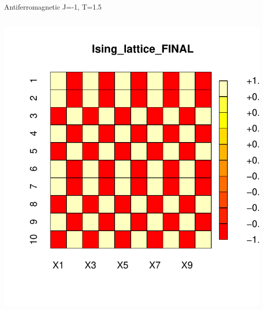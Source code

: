 \documentclass{beamer}
\begin{document}
\begin{frame}{Antiferromagnetic J=-1, T=1.5}
\begin{columns}
\begin{column}{0.5\textwidth}
\begin{center}
     \includegraphics[width=\textwidth]{Pic/J-1_60_2500_T=1.5_FINAL.pdf}
     \end{center}
\end{column}
\end{columns}
\end{frame}
\end{document}
